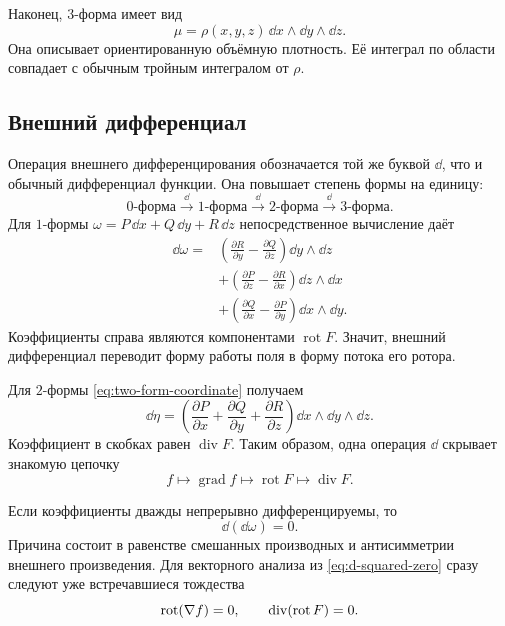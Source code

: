 Наконец, \(3\)-форма имеет вид
\[
\mu=\rho(x,y,z)\,\dd x\wedge\dd y\wedge\dd z.
\]
Она описывает ориентированную объёмную плотность. Её интеграл по области совпадает с обычным тройным интегралом от \(\rho\).

\subsection{Внешний дифференциал}

Операция внешнего дифференцирования обозначается той же буквой \(\dd\), что и обычный дифференциал функции. Она повышает степень формы на единицу:
\[
0\text{-форма}
\xrightarrow{\ \dd\ }
1\text{-форма}
\xrightarrow{\ \dd\ }
2\text{-форма}
\xrightarrow{\ \dd\ }
3\text{-форма}.
\]
Для \(1\)-формы \(\omega=P\,\dd x+Q\,\dd y+R\,\dd z\) непосредственное вычисление даёт
\begin{equation}
\label{eq:exterior-derivative-one-form}
\begin{aligned}
\dd\omega
={}&
\left(
\frac{\partial R}{\partial y}
-
\frac{\partial Q}{\partial z}
\right)\dd y\wedge\dd z
\\
&+
\left(
\frac{\partial P}{\partial z}
-
\frac{\partial R}{\partial x}
\right)\dd z\wedge\dd x
\\
&+
\left(
\frac{\partial Q}{\partial x}
-
\frac{\partial P}{\partial y}
\right)\dd x\wedge\dd y.
\end{aligned}
\end{equation}
Коэффициенты справа являются компонентами \(\operatorname{rot}F\). Значит, внешний дифференциал переводит форму работы поля в форму потока его ротора.

Для \(2\)-формы \eqref{eq:two-form-coordinate} получаем
\begin{equation}
\label{eq:exterior-derivative-two-form}
\dd\eta
=
\left(
\frac{\partial P}{\partial x}
+
\frac{\partial Q}{\partial y}
+
\frac{\partial R}{\partial z}
\right)
\dd x\wedge\dd y\wedge\dd z.
\end{equation}
Коэффициент в скобках равен \(\operatorname{div}F\). Таким образом, одна операция \(\dd\) скрывает знакомую цепочку
\[
f
\longmapsto
\operatorname{grad}f
\longmapsto
\operatorname{rot}F
\longmapsto
\operatorname{div}F.
\]

Если коэффициенты дважды непрерывно дифференцируемы, то
\begin{equation}
\label{eq:d-squared-zero}
\dd(\dd\omega)=0.
\end{equation}
Причина состоит в равенстве смешанных производных и антисимметрии внешнего произведения. Для векторного анализа из \eqref{eq:d-squared-zero} сразу следуют уже встречавшиеся тождества
\[
\operatorname{rot}(\nabla f)=0,
\qquad
\operatorname{div}(\operatorname{rot}F)=0.
\]

